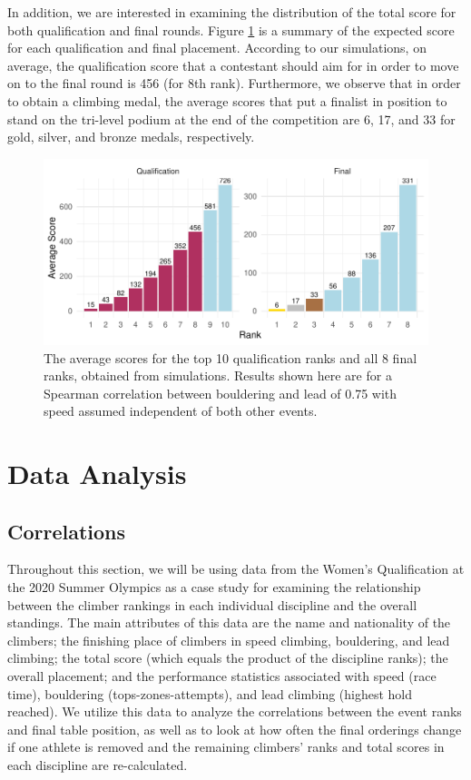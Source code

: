 \documentclass[letterpaper, inpress]{jds} %
\begin{document}
In addition, we are interested in examining the distribution of the
total score for both qualification and final rounds. Figure
\ref{fig:fig3} is a summary of the expected score for each qualification
and final placement. According to our simulations, on average, the
qualification score that a contestant should aim for in order to move on
to the final round is 456 (for 8th rank). Furthermore, we observe that
in order to obtain a climbing medal, the average scores that put a
finalist in position to stand on the tri-level podium at the end of the
competition are 6, 17, and 33 for gold, silver, and bronze medals,
respectively.

\begin{figure}
\centering
\includegraphics{scores-1.pdf}
\caption{\label{fig:fig3}The average scores for the top 10 qualification
ranks and all 8 final ranks, obtained from simulations. Results shown
here are for a Spearman correlation between bouldering and lead of 0.75
with speed assumed independent of both other events.}
\end{figure}

\section{Data Analysis}
\label{sec:sec3}

\subsection{Correlations}
\label{combined-competition-format}

Throughout this section, we will be using data from the Women's Qualification at the 2020 Summer Olympics \citep{datawiki} as a case study for examining the relationship between the climber rankings in each individual discipline and the overall standings. The main attributes of this data are the name and nationality of the climbers; the finishing place of climbers in speed climbing, bouldering, and lead climbing; the total score (which equals the product of the discipline ranks); the overall placement; and the performance statistics associated with speed (race time), bouldering (tops-zones-attempts), and lead climbing (highest hold reached). We utilize this data to analyze the correlations between the event ranks and final table position, as well as to look at how often the final orderings change if one athlete is removed and the remaining climbers' ranks and total scores in each discipline are re-calculated. 
\end{document}

